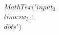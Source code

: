 \documentclass[preview]{standalone}
\begin{document}
\begin{align*}
MathTex('input _ 3  \\times  w _ 3  +\\dots')
\end{align*}
\end{document}
